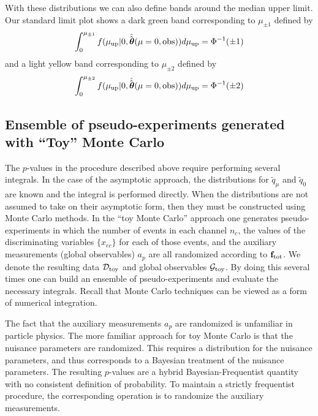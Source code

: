 \documentclass{cernrep}
\def\vec#1{\ifmmode
\mathchoice{\mbox{\boldmath$\displaystyle\bf#1$}}
{\mbox{\boldmath$\textstyle\bf#1$}}
{\mbox{\boldmath$\scriptstyle\bf#1$}}
{\mbox{\boldmath$\scriptscriptstyle\bf#1$}}\else
{\mbox{\boldmath$\bf#1$}}\fi}
\newcommand{\data}{{\ensuremath{\mathcal{D}}}}
\newcommand{\F}{{\ensuremath{\mathbf{f}}}}
\newcommand{\globs}{{\ensuremath{\mathcal{G}}}}
\begin{document}
With these distributions we can also define bands around the median upper limit.  Our standard limit plot shows a dark green band corresponding to $\mu_{\pm 1}$ defined by 
\begin{equation}
\int_{0}^{\mu_{\pm 1}}  f(\mu_{\rm up}|0,\hat{\hat{\vec{\theta}}}(\mu=0,\textrm{obs})) d\mu_{\rm up} = \Phi^{-1}(\pm 1) 
\end{equation}
and a light yellow band corresponding to $\mu_{\pm 2}$ defined by 
\begin{equation}
\int_{0}^{\mu_{\pm 2}}  f(\mu_{\rm up}|0,\hat{\hat{\vec{\theta}}}(\mu=0,\textrm{obs})) d\mu_{\rm up} = \Phi^{-1}(\pm 2) 
\end{equation}

\subsection{Ensemble of pseudo-experiments generated with ``Toy'' Monte Carlo}

The $p$-values in the procedure described above require performing several integrals.  In the case of the asymptotic approach, the distributions for $\tilde q_\mu$ and $\tilde q_0$ are known and the integral is performed directly.  When the distributions are not assumed to take on their asymptotic form, then they must be constructed using Monte Carlo methods.  In the ``toy Monte Carlo'' approach one generates pseudo-experiments in which the number of events in each channel $n_c$, the values of the discriminating variables $\{x_{ec}\}$ for each of those events, and the auxiliary measurements (global observables) $a_p$ are all randomized according to $\F_{\rm tot}$.    We  denote the resulting data $\data_{\rm toy}$ and global observables $\globs_{\rm toy}$.  By doing this several times one can build an ensemble of pseudo-experiments and evaluate the necessary integrals.  Recall that Monte Carlo techniques can be viewed as a form of numerical integration.

The fact that the auxiliary measurements $a_p$ are randomized is unfamiliar in particle physics.  The more familiar approach for toy Monte Carlo is that the nuisance parameters are randomized.  This requires a distribution for the nuisance parameters, and thus corresponds to a Bayesian treatment of the nuisance parameters.  The resulting $p$-values are a hybrid Bayesian-Frequentist quantity with no consistent definition of probability.  To maintain a strictly frequentist procedure, the corresponding operation is to randomize the auxiliary measurements.  
\end{document}
